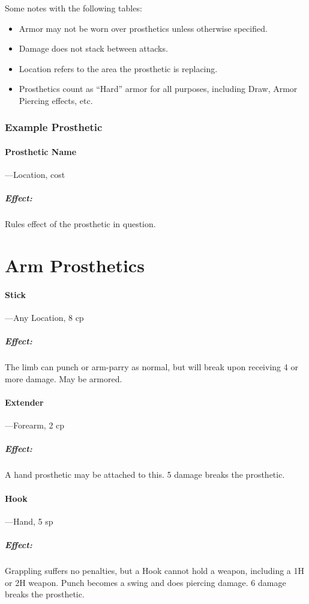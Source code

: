 \documentclass[oneside,11pt,english]{book}
\begin{document}
Some notes with the following tables: 
\begin{itemize}
\item Armor may not be worn over prosthetics unless otherwise specified. 
\item Damage does not stack between attacks. 
\item Location refers to the area the prosthetic is replacing. 
\item Prosthetics count as “Hard” armor for all purposes, including Draw, Armor Piercing effects, etc.
\end{itemize}

\subsubsection{Example Prosthetic}
	\vspace{-5pt}\paragraph{Prosthetic Name}---\quad Location, cost
	\vspace{-15pt}\subparagraph{Effect:} Rules effect of the prosthetic in question.
\section{Arm Prosthetics}
\paragraph{Stick}---\quad Any Location, 8 cp
	\vspace{-15pt}%
	\subparagraph{Effect:} The limb can punch or arm-parry as normal, but will break upon receiving 4 or more damage. May be armored.
\paragraph{Extender}---\quad Forearm, 2 cp
	\vspace{-15pt} \subparagraph{Effect:} A hand prosthetic may be attached to this. 5 damage breaks the prosthetic.
\paragraph{Hook}---\quad Hand, 5 sp
	\vspace{-15pt} \subparagraph{Effect:} Grappling suffers no penalties, but a Hook cannot hold a weapon, including a 1H or 2H weapon. Punch becomes a swing and does piercing damage. 6 damage breaks the prosthetic.
\end{document}
